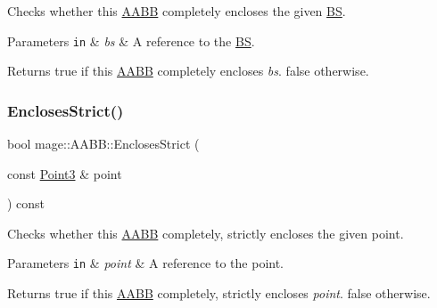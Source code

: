 Checks whether this \hyperlink{structmage_1_1_a_a_b_b}{A\+A\+BB} completely encloses the given \hyperlink{structmage_1_1_b_s}{BS}.


\begin{DoxyParams}[1]{Parameters}
\mbox{\tt in}  & {\em bs} & A reference to the \hyperlink{structmage_1_1_b_s}{BS}. \\
\hline
\end{DoxyParams}
\begin{DoxyReturn}{Returns}
{\ttfamily true} if this \hyperlink{structmage_1_1_a_a_b_b}{A\+A\+BB} completely encloses {\itshape bs}. {\ttfamily false} otherwise. 
\end{DoxyReturn}
\hypertarget{structmage_1_1_a_a_b_b_a436950a97b647179506bb42a3f2f2b34}{}\label{structmage_1_1_a_a_b_b_a436950a97b647179506bb42a3f2f2b34} 
\subsubsection{\texorpdfstring{Encloses\+Strict()}{EnclosesStrict()}\hspace{0.1cm}{\footnotesize\ttfamily [1/3]}}
{\footnotesize\ttfamily bool mage\+::\+A\+A\+B\+B\+::\+Encloses\+Strict (\begin{DoxyParamCaption}\item[{const \hyperlink{structmage_1_1_point3}{Point3} \&}]{point }\end{DoxyParamCaption}) const}

Checks whether this \hyperlink{structmage_1_1_a_a_b_b}{A\+A\+BB} completely, strictly encloses the given point.


\begin{DoxyParams}[1]{Parameters}
\mbox{\tt in}  & {\em point} & A reference to the point. \\
\hline
\end{DoxyParams}
\begin{DoxyReturn}{Returns}
{\ttfamily true} if this \hyperlink{structmage_1_1_a_a_b_b}{A\+A\+BB} completely, strictly encloses {\itshape point}. {\ttfamily false} otherwise. 
\end{DoxyReturn}
\hypertarget{structmage_1_1_a_a_b_b_a3bb59de6eca634cb3ddec4ad314fde21}{}\label{structmage_1_1_a_a_b_b_a3bb59de6eca634cb3ddec4ad314fde21} 
